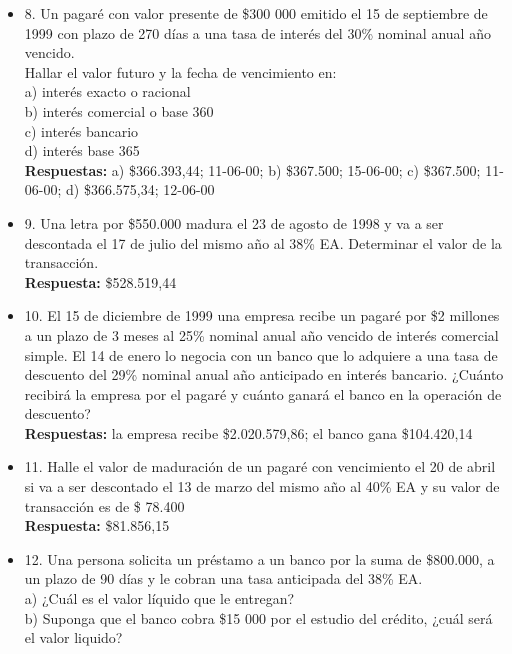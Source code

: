 \begin{itemize}
	\item 8. Un pagaré con valor presente de \$300 000 emitido el 15 de septiembre de 1999 con plazo de 270 días a una tasa de interés del 30\% nominal anual año vencido.\\
	Hallar el valor futuro y la fecha de vencimiento en:\\
	
	a) interés exacto o racional\\
	b) interés comercial o base 360\\
	c) interés bancario\\
	d) interés base 365\\
	\textbf{Respuestas:} a) \$366.393,44; 11-06-00; b) \$367.500; 15-06-00; c) \$367.500; 11-06-00; d) \$366.575,34; 12-06-00
	\medskip
	
	\item 9. Una letra por \$550.000 madura el 23 de agosto de 1998 y va a ser descontada el 17 de julio del mismo año al 38\% EA. Determinar el valor de la transacción.\\
	\textbf{Respuesta:} \$528.519,44
	\medskip
	
	\item 10. El 15 de diciembre de 1999 una empresa recibe un pagaré por \$2 millones a un plazo de 3 meses al 25\% nominal anual año vencido de interés comercial simple. El 14 de enero lo negocia con un banco que lo adquiere a una tasa de descuento del 29\% nominal anual año anticipado en interés bancario. ¿Cuánto recibirá la empresa por el pagaré y cuánto ganará el banco en la operación de descuento?\\
	
	\textbf{Respuestas:} la empresa recibe \$2.020.579,86; el banco gana \$104.420,14
	\medskip
	
	\item 11. Halle el valor de maduración de un pagaré con vencimiento el 20 de abril si va a ser descontado el 13 de marzo del mismo año al 40\% EA y su valor de transacción es de \$ 78.400\\
	\textbf{Respuesta:} \$81.856,15
	\medskip
	
	\item 12. Una persona solicita un préstamo a un banco por la suma de \$800.000, a un plazo de 90 días y le cobran una tasa anticipada del 38\% EA.\\
	
	a) ¿Cuál es el valor líquido que le entregan?\\
	b) Suponga que el banco cobra \$15 000 por el estudio del crédito, ¿cuál será el valor liquido?\\
	

\end{itemize}
